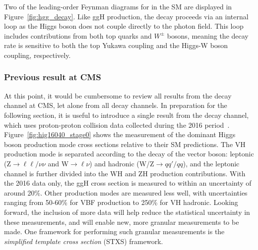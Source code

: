 Two of the leading-order Feynman diagrams for \Hgg in the SM are displayed in Figure~\ref{fig:hgg_decay}. Like ggH production, the \Hgg decay proceeds via an internal loop as the Higgs boson does not couple directly to the photon field. This loop includes contributions from both top quarks and $W^{\pm}$ bosons, meaning the \Hgg decay rate is sensitive to both the top Yukawa coupling and the Higgs-W boson coupling, respectively.

\subsubsection{Previous \Hgg result at CMS}
At this point, it would be cumbersome to review all results from the \Hgg decay channel at CMS, let alone from all decay channels. In preparation for the following section, it is useful to introduce a single result from the \Hgg decay channel, which uses proton-proton collision data collected during the 2016 period~\cite{Sirunyan:2018ouh}. Figure~\ref{fig:hig16040_stage0} shows the measurement of the dominant Higgs boson production mode cross sections relative to their SM predictions. The VH production mode is separated according to the decay of the vector boson: leptonic (Z$\rightarrow\ell\ell/\nu\nu$ and W$\rightarrow\ell\nu$) and hadronic (W/Z$\rightarrow qq'/qq$), and the leptonic channel is further divided into the WH and ZH production contributions. With the 2016 data only, the ggH cross section is measured to within an uncertainty of around 20\%. Other production modes are measured less well, with uncertainties ranging from 50-60\% for VBF production to 250\% for VH hadronic. Looking forward, the inclusion of more data will help reduce the statistical uncertainty in these measurements, and will enable new, more granular measurements to be made. One framework for performing such granular measurements is the \textit{simplified template cross section} (STXS) framework.

